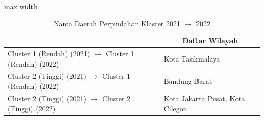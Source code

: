 \begin{table}[H]
\centering
\caption{Nama Daerah Perpindahan Klaster 2021 \(\rightarrow\) 2022} \label{tab:sample1transname2021x2022}
\begin{adjustbox}{max width=\textwidth}
\begin{tabular}{|>{\centering\arraybackslash}p{4cm}|p{10cm}|}
\hline
\multicolumn{1}{|c|}{\textbf{Kategori}} & \multicolumn{1}{c|}{\textbf{Daftar Wilayah}} \\
\hline
Cluster 1 (Rendah) (2021) \(\rightarrow\) Cluster 1 (Rendah) (2022) & Kota Tasikmalaya \\
\hline
Cluster 2 (Tinggi) (2021) \(\rightarrow\) Cluster 1 (Rendah) (2022) & Bandung Barat \\
\hline
Cluster 2 (Tinggi) (2021) \(\rightarrow\) Cluster 2 (Tinggi) (2022) & Kota Jakarta Pusat, Kota Cilegon \\
\hline
\end{tabular}
\end{adjustbox}
\end{table}